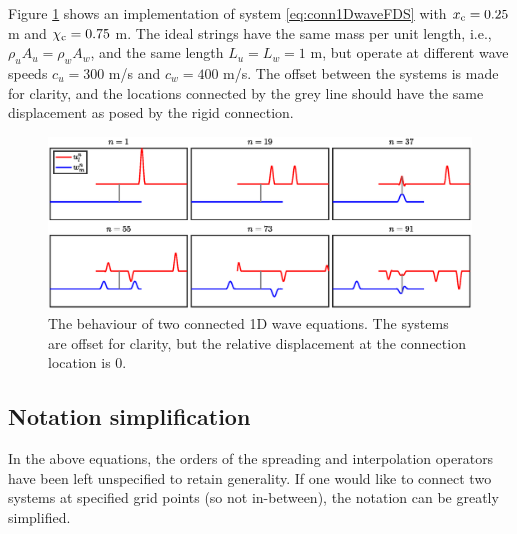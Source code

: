 Figure \ref{fig:connectedWaveEqs} shows an implementation of system \eqref{eq:conn1DwaveFDS} with $x_{\text{c}} = 0.25$ m and $\chi_{\text{c}} = 0.75$ m. The ideal strings have the same mass per unit length, i.e., $\rho_uA_u = \rho_wA_w$, and the same length $L_u=L_w = 1$ m, but operate at different wave speeds $c_u=300$ m/s and $c_w=400$ m/s. The offset between the systems is made for clarity, and the locations connected by the grey line should have the same displacement as posed by the rigid connection. 

\begin{figure}[h]
    \centering
    \includegraphics[width=\textwidth]{figures/interactions/connectedWaveEqs.eps}
    \caption{The behaviour of two connected 1D wave equations. The systems are offset for clarity, but the relative displacement at the connection location is 0. \label{fig:connectedWaveEqs}}
\end{figure}

\subsection{Notation simplification}\label{sec:notationSimplification}
In the above equations, the orders of the spreading and interpolation operators have been left unspecified to retain generality. If one would like to connect two systems at specified grid points (so not in-between), the notation can be greatly simplified.%

